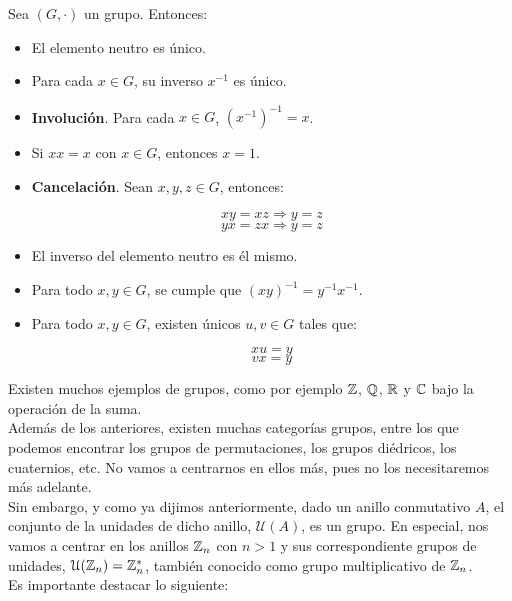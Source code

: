 \begin{proposicion}
	Sea $(G, \cdot)$ un grupo. Entonces:
	
	\begin{itemize}
		\item El elemento neutro es único.
		
		\item Para cada $x \in G$, su inverso $x^{-1}$ es único.
		
		\item \textbf{Involución}. Para cada $x \in G$, $(x^{-1})^{-1} = x$.
		
		\item Si $xx = x$ con $x \in G$, entonces $x = 1$.
		
		\item \textbf{Cancelación}. Sean $x, y, z \in G$, entonces:
		
		\[ xy = xz \Rightarrow y = z \]
		\[ yx = zx \Rightarrow y = z \]
		
		\item El inverso del elemento neutro es él mismo.
		
		\item Para todo $x, y \in G$, se cumple que $(xy)^{-1} = y^{-1}x^{-1}$.
		
		\item Para todo $x, y \in G$, existen únicos $u, v \in G$ tales que:
		
		\[ xu = y \]
		\[ vx = y \]
	\end{itemize}
\end{proposicion}

Existen muchos ejemplos de grupos, como por ejemplo $\mathbb{Z}$, $\mathbb{Q}$, $\mathbb{R}$ y $\mathbb{C}$ bajo la operación de la suma.\\

Además de los anteriores, existen muchas categorías grupos, entre los que podemos encontrar los grupos de permutaciones, los grupos diédricos, los cuaternios, etc. No vamos a centrarnos en ellos más, pues no los necesitaremos más adelante.\\

Sin embargo, y como ya dijimos anteriormente, dado un anillo conmutativo $A$, el conjunto de la unidades de dicho anillo, $\mathcal{U}(A)$, es un grupo. En especial, nos vamos a centrar en los anillos $\mathbb{Z}_n$ con $n > 1$ y sus correspondiente grupos de unidades, $\mathcal{U}(\mathbb{Z}_n) = \mathbb{Z}_n^*$, también conocido como grupo multiplicativo de $\mathbb{Z}_n$.\\

Es importante destacar lo siguiente:

